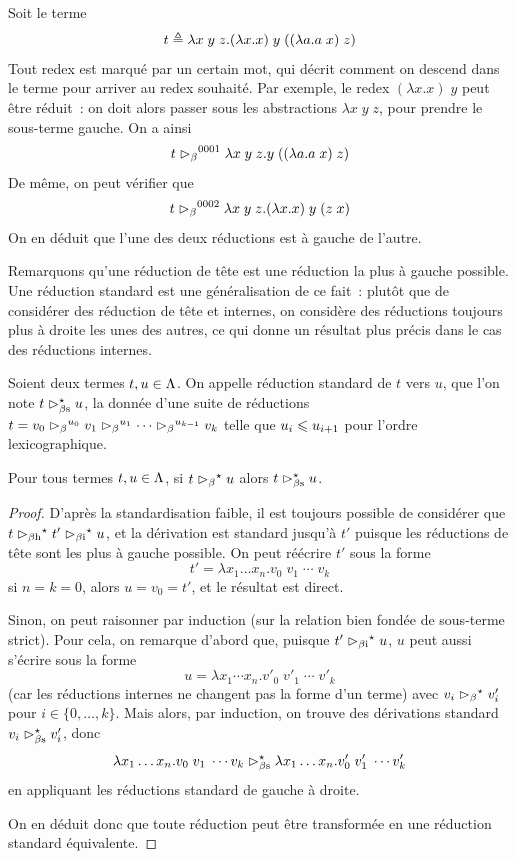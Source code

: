 \begin{example}
  Soit le terme
  \[t \triangleq \lambda x\;y\;z.(\lambda x.x)\;y\;((\lambda a.a\;x)\;z)\]
  Tout redex est marqué par un certain mot, qui décrit comment on descend dans
  le terme pour arriver au redex souhaité. Par exemple, le redex
  $(\lambda x.x)\;y$ peut être réduit~: on doit alors passer sous les
  abstractions $\lambda x\;y\;z$, pour prendre le sous-terme gauche. On a ainsi
  \[t \mathrel{\rhd_{\beta}}^{0001} \lambda x\;y\;z.y\;((\lambda a.a\;x)\;z)\]
  De même, on peut vérifier que
  \[t \mathrel{\rhd_{\beta}}^{0002} \lambda x\;y\;z.(\lambda x.x)\;y\;(z\;x)\]
  On en déduit que l'une des deux réductions est à gauche de l'autre.
\end{example}

Remarquons qu'une réduction de tête est une réduction la plus à gauche possible.
Une réduction standard est une généralisation de ce fait~: plutôt que de
considérer des réduction de tête et internes, on considère des réductions
toujours plus à droite les unes des autres, ce qui donne un résultat plus
précis dans le cas des réductions internes.

\begin{definition}
  Soient deux termes $t,u \in \Lambda$. On appelle réduction standard de $t$
  vers $u$, que l'on note $t\mathrel{\rhd_{\beta\mathrm{s}}^{\mathord{\star}}} u$, la donnée d'une suite de réductions
  $t = v_0\mathrel{\rhd_{\beta}}^{u_0} v_1 \mathrel{\rhd_{\beta}}^{u_1}\cdots \mathrel{\rhd_{\beta}}^{u_{k-1}}v_k$
  telle que $u_i \leqslant u_{i+1}$ pour l'ordre lexicographique.
\end{definition}

\begin{theorem}[Standardisation]
  Pour tous termes $t,u\in\Lambda$, si $t \mathrel{\rhd_{\beta}}^{\mathord{\star}} u$ alors $t\mathrel{\rhd_{\beta\mathrm{s}}^{\mathord{\star}}} u$.
\end{theorem}

\begin{proof}
  D'après la standardisation faible, il est toujours possible de considérer
  que $t \mathrel{\rhd_{\beta\mathrm{h}}}^{\mathord{\star}} t' \mathrel{\rhd_{\beta\mathrm{i}}}^{\mathord{\star}} u$, et la dérivation est standard
  jusqu'à $t'$ puisque les réductions de tête sont les plus à gauche possible.
  On peut réécrire $t'$ sous la forme
  \[t' = \lambda x_1\ldots x_n. v_0\;v_1\;\cdots\;v_k\]
  si $n = k = 0$, alors $u = v_0 = t'$, et le résultat est direct.

  Sinon, on peut raisonner par induction (sur la relation bien fondée de
  sous-terme strict). Pour cela, on remarque d'abord que, puisque
  $t'\mathrel{\rhd_{\beta\mathrm{i}}}^{\mathord{\star}} u$, $u$ peut aussi s'écrire sous la forme
  \[u = \lambda x_1\cdots x_n. v'_0\;v'_1\;\cdots\;v'_k\]
  (car les réductions internes ne changent pas la forme d'un terme) avec
  $v_i \mathrel{\rhd_{\beta}}^{\mathord{\star}} v'_i$ pour $i \in \{0,\ldots,k\}$.
  Mais alors, par induction, on trouve des dérivations standard
  $v_i \mathrel{\rhd_{\beta\mathrm{s}}^{\mathord{\star}}} v'_i$, donc
  \[\lambda x_1\ldots x_n.v_0\;v_1\;\cdots v_k \mathrel{\rhd_{\beta\mathrm{s}}^{\mathord{\star}}}
  \lambda x_1\ldots x_n.v'_0\;v'_1\;\cdots v'_k\]
  en appliquant les réductions standard de gauche à droite.

  On en déduit donc que toute réduction peut être transformée en une
  réduction standard équivalente.
\end{proof}

